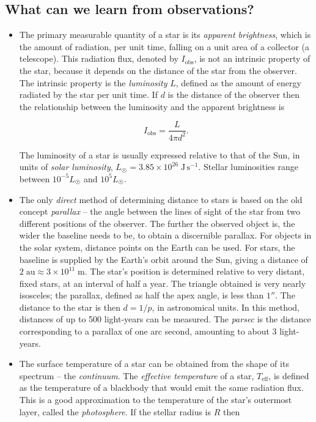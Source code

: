 \documentclass[10pt,amsmath,amssymb,aps,pra]{revtex4-2}
\newcommand{\unit}[1]{\;\mathrm{#1}}
\newcommand{\Sun}{\astrosun}
\begin{document}
\subsection{What can we learn from observations?}
\begin{itemize}
\item The primary measurable quantity of a star is its \emph{apparent
brightness}, which is the amount of radiation, per unit time, falling on a unit
area of a collector (a telescope). This radiation flux, denoted by
$I_{\text{obs}}$, is not an intrinsic property of the star, because it depends
on the distance of the star from the observer. The intrinsic property is the
\emph{luminosity} $L$, defined as the amount of energy radiated by the star per
unit time. If $d$ is the distance of the observer then the relationship between
the luminosity and the apparent brightness is

\begin{equation}
I_{\text{obs}}=\frac{L}{4\pi{d}^2}.
\end{equation}

The luminosity of a star is usually expressed relative to that of the Sun, in
units of \emph{solar luminosity}, $L_{\Sun}=3.85\times10^{26}\unit{J\,s^{-1}}$.
Stellar luminosities range between $10^{-5}L_{\Sun}$ and $10^5L_{\Sun}$.

\item The only \emph{direct} method of determining distance to stars is based on
the old concept \emph{parallax} -- the angle between the lines of sight of the
star from two different positions of the observer. The further the observed
object is, the wider the baseline needs to be, to obtain a discernible parallax.
For objects in the solar system, distance points on the Earth can be used. For
stars, the baseline is supplied by the Earth's orbit around the Sun, giving a
distance of $2\unit{au}\approx3\times10^{11}\unit{m}$. The star's position is
determined relative to very distant, fixed stars, at an interval of half a year.
The triangle obtained is very nearly isosceles; the parallax, defined as half
the apex angle, is less than $1''$. The distance to the star is then $d=1/p$, in
astronomical units. In this method, distances of up to 500 light-years can be
measured. The \emph{parsec} is the distance corresponding to a parallax of one
arc second, amounting to about 3 light-years.

\item The surface temperature of a star can be obtained from the shape of its
spectrum -- the \emph{continuum}. The \emph{effective temperature} of a star,
$T_\text{eff}$, is defined as the temperature of a blackbody that would emit the
same radiation flux. This is a good approximation to the temperature of the
star's outermost layer, called the \emph{photosphere}. If the stellar radius is
$R$ then


\end{itemize}
\end{document}
